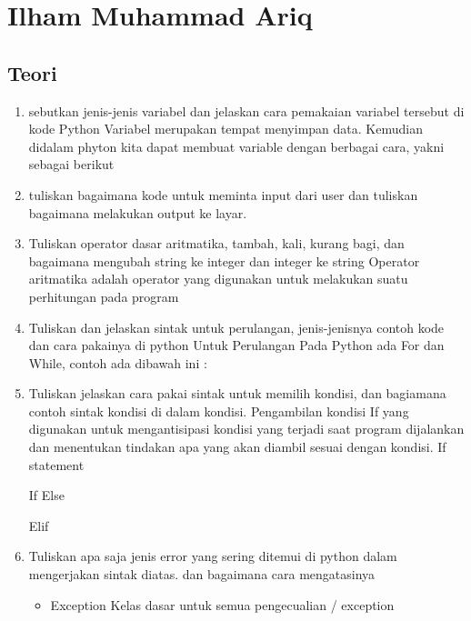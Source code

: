 \section{Ilham Muhammad Ariq}
\subsection{Teori}
\begin{enumerate}
    \item sebutkan jenis-jenis variabel dan jelaskan cara pemakaian variabel tersebut di
    kode Python
    Variabel merupakan tempat menyimpan data. Kemudian didalam phyton kita dapat membuat variable dengan berbagai cara, yakni sebagai berikut
    

    \item tuliskan bagaimana kode untuk meminta input dari user dan tuliskan bagaimana
    melakukan output ke layar.
    

    \item Tuliskan operator dasar aritmatika, tambah, kali, kurang bagi, dan bagaimana
    mengubah string ke integer dan integer ke string
    Operator  aritmatika adalah operator yang digunakan untuk melakukan suatu perhitungan pada program
    

    \item Tuliskan dan jelaskan sintak untuk perulangan, jenis-jenisnya contoh kode dan
    cara pakainya di python
    Untuk Perulangan Pada Python ada For dan While, contoh ada dibawah ini :
    

    \item Tuliskan jelaskan cara pakai sintak untuk memilih kondisi, dan bagiamana contoh sintak kondisi 		di dalam kondisi.
    Pengambilan kondisi If yang digunakan untuk mengantisipasi kondisi yang terjadi saat program 				dijalankan dan menentukan tindakan apa yang akan diambil sesuai dengan kondisi.
    If statement
    
    
    If Else
    
    
    Elif
    

    \item Tuliskan apa saja jenis error yang sering ditemui di python dalam mengerjakan
    sintak diatas. dan bagaimana cara mengatasinya
    \begin{itemize}
        \item Exception
        Kelas dasar untuk semua pengecualian / exception


\end{itemize}
\end{enumerate}
